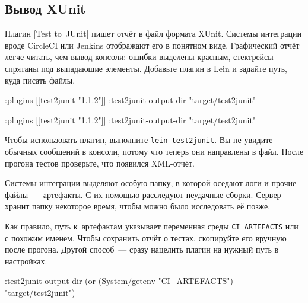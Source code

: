 \subsection{Вывод XUnit}


Плагин [Test to~JUnit]
пишет отчёт в файл формата XUnit. Системы интеграции вроде CircleCI или Jenkins
отображают его в понятном виде. Графический отчёт легче читать, чем вывод
консоли: ошибки выделены красным, стектрейсы спрятаны под выпадающие
элементы. Добавьте плагин в Lein и задайте путь, куда писать файлы.

\ifnarrow

\begin{english}
  \begin{clojure}
:plugins [[test2junit "1.1.2"]]
:test2junit-output-dir
  "target/test2junit"
  \end{clojure}
\end{english}

\else

\begin{english}
  \begin{clojure}
:plugins [[test2junit "1.1.2"]]
:test2junit-output-dir "target/test2junit"
  \end{clojure}
\end{english}

\fi

Чтобы использовать плагин, выполните \verb|lein test2junit|. Вы не увидите
обычных сообщений в консоли, потому что теперь они направлены в файл. После
прогона тестов проверьте, что появился XML-отчёт.

Системы интеграции выделяют особую папку, в которой оседают логи и прочие
файлы~--- артефакты. С их помощью расследуют неудачные сборки. Сервер хранит
папку некоторое время, чтобы можно было исследовать её позже.

Как правило, путь к~артефактам указывает переменная среды \verb|CI_ARTEFACTS|
или с похожим именем. Чтобы сохранить отчёт о тестах, скопируйте его вручную
после прогона. Другой способ~--- сразу нацелить плагин на нужный путь в
настройках.

\begin{english}
  \begin{clojure}
:test2junit-output-dir
  (or (System/getenv "CI_ARTEFACTS")
      "target/test2junit")
  \end{clojure}
\end{english}

